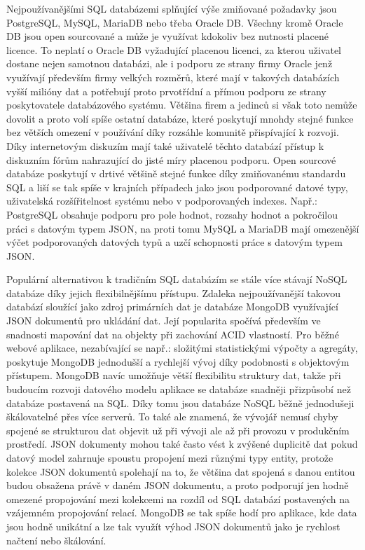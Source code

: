 \begin{itemize}
\begin{itemize}
		Nejpoužívanějšími \Ac{SQL} databázemi splňující výše zmiňované požadavky jsou PostgreSQL, MySQL, MariaDB
		nebo třeba Oracle DB.
		Všechny kromě Oracle DB jsou open sourcované a může je využívat kdokoliv bez nutnosti placené licence.
		To neplatí o Oracle DB vyžadující placenou licenci, za kterou uživatel dostane nejen samotnou databázi, ale
		i podporu ze strany firmy Oracle jenž využívají především firmy velkých rozměrů, které mají v takových databázích
		vyšší milióny dat a potřebují proto prvotřídní a přímou podporu ze strany poskytovatele databázového systému.
		Většina firem a jedinců si však toto nemůže dovolit a proto volí spíše ostatní databáze, které poskytují mnohdy
		stejné funkce bez větších omezení v používání díky rozsáhle komunitě přispívající k rozvoji.
		Díky internetovým diskuzím mají také uživatelé těchto databází přístup k diskuzním fórům nahrazující do jisté míry
		placenou podporu.
		Open sourcové databáze poskytují v drtivé většině stejné funkce díky zmiňovanému standardu \Ac{SQL} a
		liší se tak spíše v krajních případech jako jsou podporované datové typy, uživatelská rozšířitelnost systému
		nebo v podporovaných indexes.
		Např.: PostgreSQL obsahuje podporu pro pole hodnot, rozsahy hodnot a pokročilou práci s datovým typem \Ac{JSON},
		na proti tomu MySQL a MariaDB mají omezenější výčet podporovaných datových typů a uzčí schopnosti práce s datovým
		typem \Ac{JSON}.

		Populární alternativou k tradičním \Ac{SQL} databázím se stále více stávají \Ac{NoSQL} databáze
		díky jejich flexibilnějšímu přístupu.
		Zdaleka nejpoužívanější takovou databází sloužící jako zdroj primárních dat je databáze MongoDB využívající
		\Ac{JSON} dokumentů pro ukládání dat.
		Její popularita spočívá především ve snadnosti mapování dat na objekty při zachování \Ac{ACID} vlastností.
		Pro běžné webové aplikace, nezabívající se např.: složitými statistickými výpočty a agregáty, poskytuje MongoDB
		jednodušší a rychlejší vývoj díky podobnosti s objektovým přístupem.
		MongoDB navíc umožňuje větší flexibilitu struktury dat, takže při budoucím rozvoji datového modelu aplikace se
		databáze snadněji přizpůsobí než databáze postavená na \Ac{SQL}.
		Díky tomu jsou databáze \Ac{NoSQL} běžně jednodušeji škálovatelné přes více serverů.\cite{when_to_use_nosql}
		To také ale znamená, že vývojář nemusí chyby spojené se strukturou dat objevit už při vývoji ale až při provozu
		v produkčním prostředí.
		\Ac{JSON} dokumenty mohou také často vést k zvýšené duplicitě dat pokud datový model zahrnuje spoustu
		propojení mezi různými typy entity, protože kolekce \Ac{JSON} dokumentů spolehají na to, že většina dat
		spojená s danou entitou budou obsažena právě v daném \Ac{JSON} dokumentu, a proto podporují jen hodně
		omezené propojování mezi kolekcemi na rozdíl od \Ac{SQL} databází postavených na vzájemném propojování
		relací.
		MongoDB se tak spíše hodí pro aplikace, kde data jsou hodně unikátní a lze tak využít výhod \Ac{JSON}
		dokumentů jako je rychlost načtení nebo škálování.\cite{why_you_should_never_use_mongodb}


\end{itemize}
\end{itemize}
